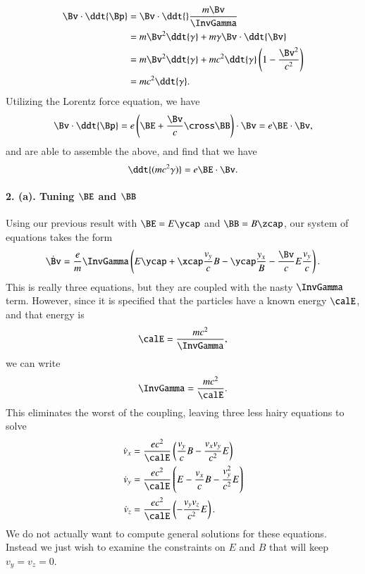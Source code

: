 {\begin{equation}
\begin{aligned}
\Bv \cdot \ddt{\Bp}
&= \Bv \cdot \ddt{} \frac{m \Bv}{\InvGamma} \\
&= m\Bv^2 \ddt{\gamma} + m \gamma \Bv \cdot \ddt{\Bv} \\
&= m\Bv^2 \ddt{\gamma} + m c^2 \ddt{\gamma} \left( 1 - \frac{\Bv^2}{c^2} \right) \\
&= m c^2 \ddt{\gamma}.
\end{aligned}
\end{equation}
%
Utilizing the Lorentz force equation, we have
%
\begin{equation}\label{eqn:relElectroDynProblemSet2:250}
\Bv \cdot \ddt{\Bp} = e \left( \BE + \frac{\Bv}{c} \cross \BB \right) \cdot \Bv = e \BE \cdot \Bv,
\end{equation}
and are able to assemble the above, and find that we have
\begin{equation}\label{eqn:relElectroDynProblemSet2:270}
\ddt{(m c^2 \gamma)} = e \BE \cdot \Bv.
\end{equation}
\paragraph{2. (a). Tuning \texorpdfstring{\(\BE\) and \(\BB\)}{E and B}}
Using our previous result with \(\BE = E \ycap\) and \(\BB = B \zcap\), our system of equations takes the form
%
\begin{equation}\label{eqn:relElectroDynProblemSet2:290}
\dot{\Bv} = \frac{e}{m} \InvGamma \left( E \ycap + \xcap \frac{v_y}{c} B - \ycap \frac{y_x} B - \frac{\Bv}{c} E \frac{v_y}{c} \right).
\end{equation}
This is really three equations, but they are coupled with the nasty \(\InvGamma\) term.  However, since it is specified that the particles have a known energy \(\calE\), and that energy is
%
\begin{equation}\label{eqn:relElectroDynProblemSet2:310}
\calE = \frac{ m c^2 }{\InvGamma},
\end{equation}
we can write
%
\begin{equation}\label{eqn:relElectroDynProblemSet2:330}
\InvGamma = \frac{ m c^2 }{\calE}.
\end{equation}
%
This eliminates the worst of the coupling, leaving three less hairy equations to solve
%
\begin{equation}\label{eqn:relElectroDynProblemSet2:350}
\begin{aligned}
\dot{v}_x &= \frac{e c^2}{\calE} \left( \frac{v_y}{c} B - \frac{v_x v_y}{c^2} E \right) \\
\dot{v}_y &= \frac{e c^2}{\calE} \left( E - \frac{v_x}{c} B - \frac{v_y^2}{c^2} E \right) \\
\dot{v}_z &= \frac{e c^2}{\calE} \left( - \frac{v_y v_z}{c^2} E \right).
\end{aligned}
\end{equation}
%
We do not actually want to compute general solutions for these equations.  Instead we just wish to examine the constraints on \(E\) and \(B\) that will keep \(v_y = v_z = 0\).

}
